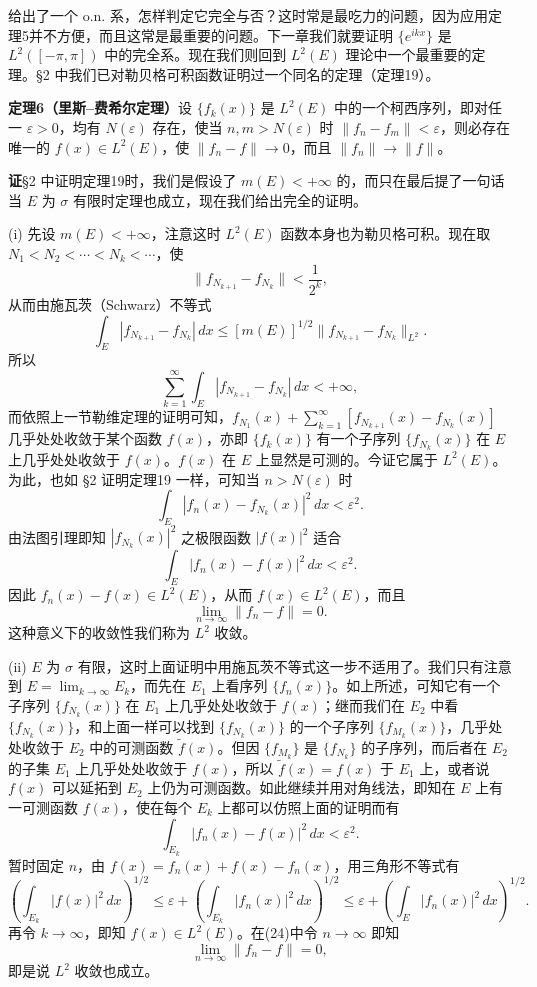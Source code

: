 给出了一个 o.n. 系，怎样判定它完全与否？这时常是最吃力的问题，因为应用定理5并不方便，而且这常是最重要的问题。下一章我们就要证明 $\{e^{ikx}\}$ 是 $L^2([ -\pi,\pi])$ 中的完全系。现在我们则回到 $L^2(E)$ 理论中一个最重要的定理。§2 中我们已对勒贝格可积函数证明过一个同名的定理（定理19）。

\noindent\textbf{定理6（里斯--费希尔定理）}\quad 设 $\{f_k(x)\}$ 是 $L^2(E)$ 中的一个柯西序列，即对任一 $\varepsilon>0$，均有 $N(\varepsilon)$ 存在，使当 $n,m>N(\varepsilon)$ 时 $\|f_n-f_m\|<\varepsilon$，则必存在唯一的 $f(x)\in L^2(E)$，使 $\|f_n-f\|\to0$，而且 $\|f_n\|\to\|f\|$。

\noindent\textbf{证}\quad §2 中证明定理19时，我们是假设了 $m(E)<+\infty$ 的，而只在最后提了一句话当 $E$ 为 $\sigma$ 有限时定理也成立，现在我们给出完全的证明。

(i) 先设 $m(E)<+\infty$，注意这时 $L^2(E)$ 函数本身也为勒贝格可积。现在取 $N_1<N_2<\cdots<N_k<\cdots$，使
\[
 \|f_{N_{k+1}}-f_{N_k}\|<\frac1{2^k},
\]
从而由施瓦茨（Schwarz）不等式
\[
 \int_E|f_{N_{k+1}}-f_{N_k}|\,dx\le[m(E)]^{1/2}\|f_{N_{k+1}}-f_{N_k}\|_{L^2}.
\]
所以
\[
 \sum_{k=1}^{\infty}\int_E|f_{N_{k+1}}-f_{N_k}|\,dx<+\infty,
\]
而依照上一节勒维定理的证明可知，$f_{N_1}(x)+\sum_{k=1}^{\infty}[f_{N_{k+1}}(x)-f_{N_k}(x)]$ 几乎处处收敛于某个函数 $f(x)$，亦即 $\{f_k(x)\}$ 有一个子序列 $\{f_{N_k}(x)\}$ 在 $E$ 上几乎处处收敛于 $f(x)$。$f(x)$ 在 $E$ 上显然是可测的。今证它属于 $L^2(E)$。为此，也如 §2 证明定理19 一样，可知当 $n>N(\varepsilon)$ 时
\[
 \int_E|f_n(x)-f_{N_k}(x)|^2\,dx<\varepsilon^2.
\]
由法图引理即知 $|f_{N_k}(x)|^2$ 之极限函数 $|f(x)|^2$ 适合
\[
 \int_E|f_n(x)-f(x)|^2\,dx<\varepsilon^2.
\]
因此 $f_n(x)-f(x)\in L^2(E)$，从而 $f(x)\in L^2(E)$，而且
\begin{equation}
 \lim_{n\to\infty}\|f_n-f\|=0.
 \tag{23}
\end{equation}
这种意义下的收敛性我们称为 $L^2$ 收敛。

(ii) $E$ 为 $\sigma$ 有限，这时上面证明中用施瓦茨不等式这一步不适用了。我们只有注意到 $E=\lim_{k\to\infty}E_k$，而先在 $E_1$ 上看序列 $\{f_n(x)\}$。如上所述，可知它有一个子序列 $\{f_{N_k}(x)\}$ 在 $E_1$ 上几乎处处收敛于 $f(x)$；继而我们在 $E_2$ 中看 $\{f_{N_k}(x)\}$，和上面一样可以找到 $\{f_{N_k}(x)\}$ 的一个子序列 $\{f_{M_k}(x)\}$，几乎处处收敛于 $E_2$ 中的可测函数 $\widetilde f(x)$。但因 $\{f_{M_k}\}$ 是 $\{f_{N_k}\}$ 的子序列，而后者在 $E_2$ 的子集 $E_1$ 上几乎处处收敛于 $f(x)$，所以 $\widetilde f(x)=f(x)$ 于 $E_1$ 上，或者说 $f(x)$ 可以延拓到 $E_2$ 上仍为可测函数。如此继续并用对角线法，即知在 $E$ 上有一可测函数 $f(x)$，使在每个 $E_k$ 上都可以仿照上面的证明而有
\begin{equation}
 \int_{E_k}|f_n(x)-f(x)|^2\,dx<\varepsilon^2.
 \tag{24}
\end{equation}
暂时固定 $n$，由 $f(x)=f_n(x)+f(x)-f_n(x)$，用三角形不等式有
\[
 \left(\int_{E_k}|f(x)|^2\,dx\right)^{1/2}
 \le\varepsilon+\left(\int_{E_k}|f_n(x)|^2\,dx\right)^{1/2}
 \le\varepsilon+\left(\int_E|f_n(x)|^2\,dx\right)^{1/2}.
\]
再令 $k\to\infty$，即知 $f(x)\in L^2(E)$。在(24)中令 $n\to\infty$ 即知
\[
 \lim_{n\to\infty}\|f_n-f\|=0,
\]
即是说 $L^2$ 收敛也成立。

